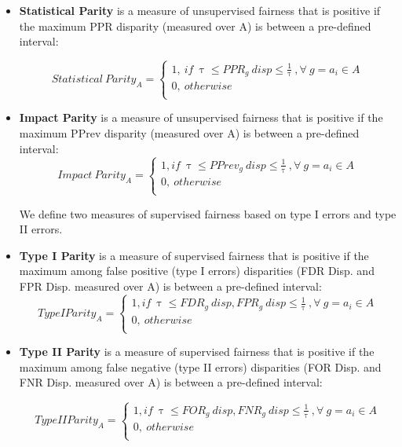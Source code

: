 \begin{itemize}
\item [-] \textbf{Statistical Parity} is a measure of unsupervised fairness that is positive if the maximum PPR disparity (measured over A) is between a pre-defined interval:



$$ Statistical \ Parity_A = \begin{cases}
      1, \ if \ \uptau \leq PPR_g \ disp \leq \frac{1}{\uptau} \ , \forall \ g = a_i \in A
    \\
      0, \ otherwise \\
    \end{cases}   
$$


\item [-] \textbf{Impact Parity} is a measure of unsupervised fairness that is positive if the maximum PPrev disparity (measured over A) is between a pre-defined interval:
$$ Impact \ Parity_A =
    \begin{cases}
      1, if \ \uptau \leq  PPrev_g \ disp \leq \frac{1}{\uptau} \ , \forall \ g = a_i \in A
 \\
      0, \ otherwise \\
    \end{cases}
$$ 

We define two measures of supervised fairness based on type I errors and type II errors.

\item [-] \textbf{Type I Parity}  is a measure of supervised fairness that is positive if the maximum among false positive (type I errors) disparities (FDR Disp. and FPR Disp. measured over A) is between a pre-defined interval:
$$ Type I Parity_A =   \begin{cases}
      1, if \  \uptau \leq FDR_g \ disp, FPR_g \ disp \leq \frac{1}{\uptau} \ , \forall \ g = a_i \in A
 \\
      0, \ otherwise \\
    \end{cases}
$$

\item [-] \textbf{Type II Parity} is a measure of supervised fairness that is positive if the maximum among false negative (type II errors) disparities (FOR Disp. and FNR Disp. measured over A) is between a pre-defined interval:
       
$$Type II Parity_A = \begin{cases}
      1, if \ \uptau \leq FOR_g \ disp,FNR_g \ disp \leq   \frac{1}{\uptau} \ , \forall \ g = a_i \in A
 \\
      0, \ otherwise \\
    \end{cases}
    $$ 


\end{itemize}

